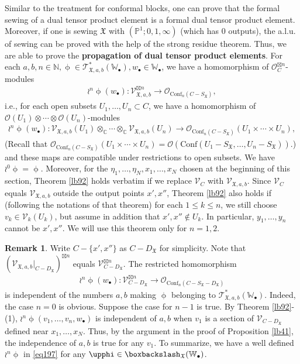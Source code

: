 \documentclass[12pt,b5paper,notitlepage]{report}
\theoremstyle{definition}
\newtheorem{rem}[df]{Remark}
\theoremstyle{plain}
\newcommand{\fk}{\mathfrak}
\newcommand{\Conf}{\mathrm{Conf}}
\newcommand{\scr}{\mathscr}
\newcommand{\SX}{S_{\fk X}}
\newcommand{\DX}{D_{\fk X}}
\newcommand{\blt}{\bullet}
\newcommand{\Wbb}{\mathbb W}
\newcommand{\Cbb}{\mathbb C}
\newcommand{\Nbb}{\mathbb N}
\newcommand{\Pbb}{\mathbb P}
\numberwithin{equation}{section}
\begin{document}
Similar to the treatment for conformal blocks, one can prove that the formal sewing of a dual tensor product element is a formal dual tensor product element. Moreover, if one is sewing $\fk X$ with  $(\Pbb^1;0,1,\infty)$ (which has $0$ outputs), the a.l.u. of sewing can be proved with the help of the strong residue theorem. Thus, we are able to prove the \textbf{propagation of dual tensor product elements}.  For each $a,b,n\in\Nbb,\upphi\in\scr T_{\fk X,a,b}^*(\Wbb_\blt),w_\blt\in\Wbb_\blt$, we have a homomorphism of $\scr O_C^{\boxtimes n}$-modules
\begin{gather*}
\wr^n\upphi(w_\blt):\scr V_{\fk X,a,b}^{\boxtimes n}\rightarrow\scr O_{\Conf_n(C-\SX)},
\end{gather*}
i.e., for each open subsets $U_1,\dots,U_n\subset C$, we have a homomorphism of $\scr O(U_1)\otimes\cdots\otimes\scr O(U_n)$-modules
\begin{gather*}
\wr^n\upphi(w_\blt):\scr V_{\fk X,a,b}(U_1)\otimes_\Cbb\cdots\otimes_\Cbb\scr V_{\fk X,a,b}(U_n)\rightarrow\scr O_{\Conf_n(C-\SX)}(U_1\times\cdots\times U_n),
\end{gather*}
(Recall that $\scr O_{\Conf_n(C-\SX)}(U_1\times\cdots\times U_n)=\scr O(\Conf(U_1-\SX,\dots,U_n-\SX))$.) and these maps are compatible under restrictions to open subsets. We have $\wr^0\upphi=\upphi$. Moreover, for the $\eta_1,\dots,\eta_N,x_1,\dots,x_N$ chosen at the beginning of this section, Theorem \ref{lb92} holds verbatim if we replace $\scr V_C$ with $\scr V_{\fk X,a,b}$. Since $\scr V_C$ equals $\scr V_{\fk X,a,b}$ outside the output points $x',x''$, Theorem \ref{lb92} also holds if (following the notations of that theorem) for each $1\leq k\leq n$, we still choose $v_k\in\scr V_k(U_k)$, but assume in addition that $x',x''\notin U_k$. In particular, $y_1,\dots,y_n$ cannot be $x',x''$. We will use this theorem only for $n=1,2$.


\begin{rem}
Write $C-\{x',x''\}$ as $C-\DX$ for simplicity. Note that $(\scr V_{\fk X,a,b}|_{C-\DX})^{\boxtimes n}$ equals $\scr V_{C-\DX}^{\boxtimes n}$. The restricted homomorphism
\begin{gather}
\wr^n\upphi(w_\blt):\scr V_{C-\DX}^{\boxtimes n}\rightarrow\scr O_{\Conf_n(C-\SX-\DX)}\label{eq197}
\end{gather} 
is independent of the numbers $a,b$ making $\upphi$ belonging to $\scr T_{\fk X,a,b}^*(\Wbb_\blt)$. Indeed, the case $n=0$ is obvious. Suppose the case for $n-1$ is true.  By  Theorem \ref{lb92}-(1), $\wr^n\upphi(v_1,\dots,v_n,w_\blt)$ is independent of $a,b$ when $v_1$ is a section of $\scr V_{C-\DX}$ defined near $x_1,\dots,x_N$.  Thus, by the argument in the proof of Proposition \ref{lb41}, the independence of $a,b$ is true for any $v_1$. To summarize, we have a well defined $\wr^n\upphi$ in \eqref{eq197} for any $\upphi\in\boxbackslash_{\fk X}(\Wbb_\blt)$. 
\end{rem}
\end{document}
